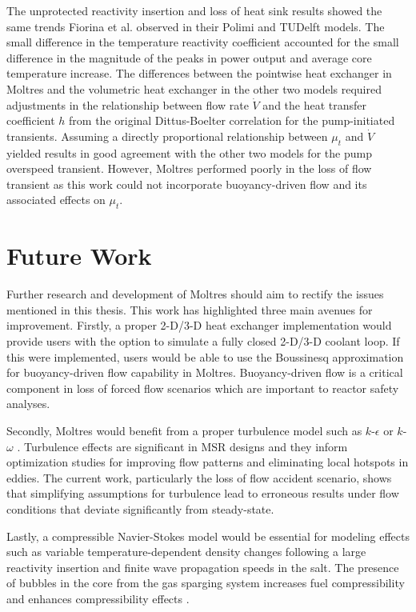 The unprotected reactivity insertion and loss of heat sink results showed the
same trends Fiorina et al. \cite{fiorina_modelling_2014} observed in their
Polimi and TUDelft models. The
small difference in the temperature reactivity coefficient accounted for the
small difference in the magnitude of the peaks in power output and average
core temperature increase. The differences between the pointwise heat
exchanger in Moltres and the volumetric heat exchanger in the other two
models required adjustments in the relationship between flow rate
$\dot{V}$ and the heat transfer coefficient $h$ from the original
Dittus-Boelter correlation for the pump-initiated transients. Assuming a
directly proportional relationship between $\mu_t$ and $\dot{V}$ yielded
results in good agreement with the other two models for the pump overspeed
transient. However, Moltres performed poorly in the loss of flow transient as
this work could not incorporate buoyancy-driven flow and its associated
effects on $\mu_t$.

\section{Future Work}

Further research and development of Moltres should aim to rectify the issues
mentioned in this thesis. This work has highlighted three main avenues for
improvement. Firstly, a proper 2-D/3-D heat exchanger implementation would
provide users with the option to simulate a fully closed
2-D/3-D coolant loop. If this were implemented, users would be able to use
the Boussinesq approximation for buoyancy-driven flow capability in Moltres.
Buoyancy-driven flow is a critical component in loss of forced flow scenarios
which are important to reactor safety analyses.

Secondly, Moltres would benefit from a proper turbulence model such as
$k$-$\epsilon$ \cite{jones_prediction_1972} or $k$-$\omega$
\cite{wilcox_turbulence_2006}. Turbulence effects are
significant in \gls{MSR} designs and they inform optimization
studies for improving flow patterns and eliminating local hotspots in eddies.
The current work, particularly the loss of flow accident scenario, shows
that simplifying assumptions for turbulence lead to erroneous results under
flow conditions that deviate significantly from steady-state.

Lastly, a compressible Navier-Stokes model would be essential for modeling
effects such as variable temperature-dependent density
changes following a large reactivity insertion and finite wave propagation
speeds in the salt. The presence of bubbles in the core from the gas sparging
system increases fuel compressibility and enhances compressibility effects
\cite{cervi_development_2019}. 
